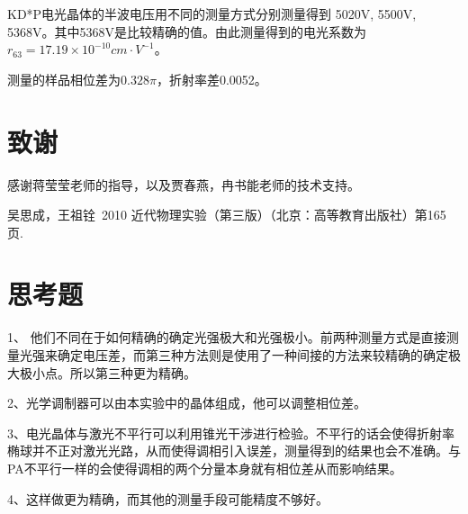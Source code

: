 \documentclass[aps,pre,12pt,preprint,onecolumn,showpacs,showkeys,UTF8]{revtex4-1}
\begin{document}
KD*P电光晶体的半波电压用不同的测量方式分别测量得到 5020V, 5500V, 5368V。其中5368V是比较精确的值。由此测量得到的电光系数为$r_{63}=17.19\times10^{-10} cm \cdot V^{-1}$。

测量的样品相位差为$0.328\pi$，折射率差0.0052。


\section{致谢} 
感谢蒋莹莹老师的指导，以及贾春燕，冉书能老师的技术支持。

\begin{thebibliography}{}
	 吴思成，王祖铨~2010 近代物理实验（第三版）（北京：高等教育出版社）第165页.%
%
\end{thebibliography}

\clearpage
\appendix
\section{思考题} 

1、 他们不同在于如何精确的确定光强极大和光强极小。前两种测量方式是直接测量光强来确定电压差，而第三种方法则是使用了一种间接的方法来较精确的确定极大极小点。所以第三种更为精确。

2、光学调制器可以由本实验中的晶体组成，他可以调整相位差。

3、电光晶体与激光不平行可以利用锥光干涉进行检验。不平行的话会使得折射率椭球并不正对激光光路，从而使得调相引入误差，测量得到的结果也会不准确。与PA不平行一样的会使得调相的两个分量本身就有相位差从而影响结果。

4、这样做更为精确，而其他的测量手段可能精度不够好。
\end{document}
